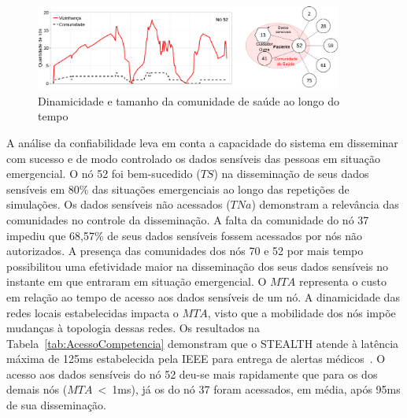 \documentclass[12pt]{article}
\begin{document}
\begin{figure}[!htb]
\centering
\includegraphics[width=0.9\textwidth]{figures/neighs_cois_v2_890s_stack_1node.pdf}
\vspace{-0.2cm}
\caption{Dinamicidade e tamanho da comunidade de saúde ao longo do tempo}
\label{fig:neighs_x_cois}
\end{figure}


A análise da confiabilidade leva em conta a capacidade do sistema em disseminar com sucesso e de modo controlado os dados sensíveis das pessoas em situação emergencial. O nó 52 foi bem-sucedido ($TS$) na disseminação de seus dados sensíveis em 80\% das situações emergenciais ao longo das repetições de simulações. Os dados sensíveis não acessados ($TNa$) demonstram a relevância das comunidades no controle da disseminação.
A falta da comunidade do nó 37 impediu que 68,57\% de seus dados sensíveis fossem acessados por nós não autorizados. A presença das comunidades dos nós 70 e 52 por mais tempo possibilitou uma efetividade maior na disseminação dos seus dados sensíveis no instante em que entraram em situação emergencial. O $MTA$ representa o custo em relação ao tempo de acesso aos dados sensíveis de um nó. A dinamicidade das redes locais estabelecidas impacta o \textbf{$MTA$}, visto que a mobilidade dos nós impõe mudanças à topologia dessas redes. Os resultados na Tabela~\ref{tab:AcessoCompetencia} demonstram que o \mbox{STEALTH} atende à latência máxima de 125ms estabelecida pela IEEE para entrega de alertas médicos~\cite{ieee2012}. O acesso aos dados sensíveis do nó 52 deu-se mais rapidamente que para os dos demais nós ($MTA$~<~1ms), já os do nó 37 foram acessados, em média, após 95ms de sua disseminação. 
\end{document}
